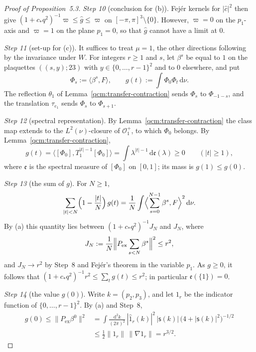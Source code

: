 \documentclass[11pt,letterpaper,reqno]{amsart}
\theoremstyle{definition}
\begin{document}
\begin{proof}[Proof of Proposition~5.3]
\emph{Step 10} (conclusion for (b)).
Fej\'er kernels for $|\hat c|^2$ then give $(1+c_*q^2)^{-1}\varpi\le\hat g\le\varpi$ on $[-\pi,\pi]^3\setminus\{0\}$.
However, $\varpi=0$ on the $p_1$-axis and $\varpi=1$ on the plane $p_1=0$, so that $\hat g$ cannot have a limit at $0$.

\emph{Step 11} (set-up for (c)).
It suffices to treat $\mu=1$, the other directions following by the invariance under $W$.
For integers $r\ge1$ and $s$, let $\beta^s$ be equal to $1$ on the plaquettes $((s,y);23)$ with $y\in\{0,\dots,r-1\}^2$ and to $0$ elsewhere, and put
\begin{equation*}
\Phi_s:=\langle\beta^s,F\rangle,\qquad g(t):=\int\Phi_0\Phi_t\,\mathrm d\nu.
\end{equation*}
The reflection $\theta_1$ of Lemma~\ref{qcm:transfer-contraction} sends $\Phi_s$ to $\Phi_{-1-s}$, and the translation $\tau_{e_1}$ sends $\Phi_s$ to $\Phi_{s+1}$.

\emph{Step 12} (spectral representation).
By Lemma~\ref{qcm:transfer-contraction} the class map extends to the $L^2(\nu)$-closure of $\mathcal O^+_1$, to which $\Phi_0$ belongs.
By Lemma~\ref{qcm:transfer-contraction},
\begin{equation*}
g(t)=\bigl\langle[\Phi_0],T_1^{|t|-1}[\Phi_0]\bigr\rangle=\int\lambda^{|t|-1}\,\mathrm d\mathfrak e(\lambda)\ge0\qquad(|t|\ge1),
\end{equation*}
where $\mathfrak e$ is the spectral measure of $[\Phi_0]$ on $[0,1]$; its mass is $g(1)\le g(0)$.

\emph{Step 13} (the sum of $g$).
For $N\ge1$,
\begin{equation*}
\sum_{|t|<N}\Bigl(1-\frac{|t|}{N}\Bigr)\,g(t)=\frac1N\int\Bigl\langle\sum_{s=0}^{N-1}\beta^s,F\Bigr\rangle^2\,\mathrm d\nu.
\end{equation*}
By (a) this quantity lies between $(1+c_*q^2)^{-1}J_N$ and $J_N$, where
\begin{equation*}
J_N:=\frac1N\Bigl\|P_{\mathrm{ex}}\sum_{s<N}\beta^s\Bigr\|^2\le r^2,
\end{equation*}
and $J_N\to r^2$ by Step~8 and Fej\'er's theorem in the variable $p_1$.
As $g\ge0$, it follows that $(1+c_*q^2)^{-1}r^2\le\sum_tg(t)\le r^2$; in particular $\mathfrak e(\{1\})=0$.

\emph{Step 14} (the value $g(0)$).
Write $k=(p_2,p_3)$, and let $1_r$ be the indicator function of $\{0,\dots,r-1\}^2$.
By (a) and Step~8,
\begin{align*}
g(0)\le\|P_{\mathrm{ex}}\beta^0\|^2
&=\int\frac{\mathrm d^2k}{(2\pi)^2}\,|\hat{1}_r(k)|^2\,|\mathsf s(k)|\,\bigl(4+|\mathsf s(k)|^2\bigr)^{-1/2}\\
&\le\frac12\|1_r\|\,\|\nabla 1_r\|=r^{3/2}.
\end{align*}


\end{proof}
\end{document}
